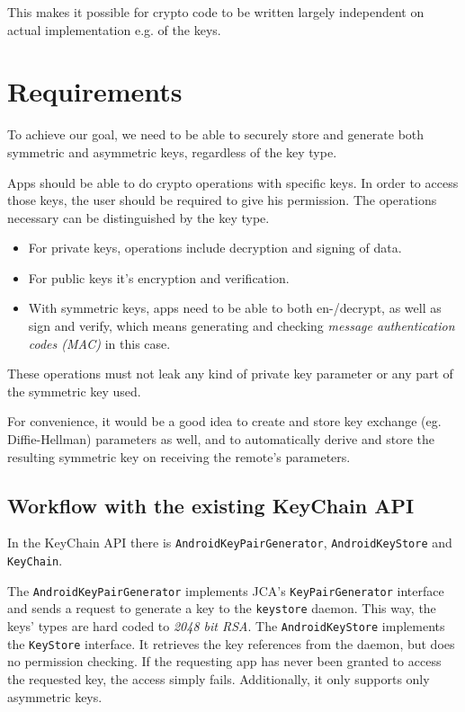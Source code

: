 \documentclass[a4paper,draft]{scrartcl}
\begin{document}
		This makes it possible for crypto code to be written largely independent on actual implementation e.g. of the keys.

	\section{Requirements}
		To achieve our goal, we need to be able to securely store and generate both symmetric and asymmetric keys, regardless of the key type.

		Apps should be able to do crypto operations with specific keys. In order to access those keys, the user should be required to give his permission. The operations necessary can be distinguished by the key type.
		\begin{itemize}
			\item For private keys, operations include decryption and signing of data.
			\item For public keys it's encryption and verification.
			\item With symmetric keys, apps need to be able to both en-/decrypt, as well as sign and verify, which means generating and checking {\em message authentication codes (MAC)} in this case.
		\end{itemize}

		These operations must not leak any kind of private key parameter or any part of the symmetric key used.

		For convenience, it would be a good idea to create and store key exchange (eg. Diffie-Hellman) parameters as well, and to automatically derive and store the resulting symmetric key on receiving the remote's parameters. %

	\subsection{Workflow with the existing KeyChain API}
		In the KeyChain API there is \texttt{AndroidKeyPairGenerator}, \texttt{AndroidKeyStore} \linebreak and \texttt{KeyChain}.

		The \texttt{AndroidKeyPairGenerator} implements JCA's \texttt{KeyPairGenerator} interface and sends a request to generate a key to the \texttt{keystore} daemon. This way, the keys' types are hard coded to {\em 2048 bit RSA}. The \texttt{AndroidKeyStore} implements the \texttt{KeyStore} interface. It retrieves the key references from the daemon, but does no permission checking. If the requesting app has never been granted to access the requested key, the access simply fails. Additionally, it only supports only asymmetric keys.
\end{document}
